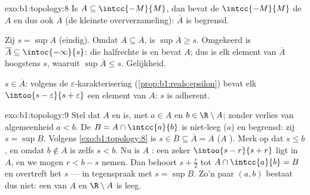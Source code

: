 \begin{solution}{exo:b1:topology:8}
Is $A \subseteq \intcc{-M}{M}$, dan bevat de 
$\intcc{-M}{M}$ de  $A$ en dus ook $\overline A$ (de kleinste
 oververzameling): $\overline A$ is begrensd.

Zij $s = \sup A$ (eindig). Omdat $A \subseteq \overline A$, is $\sup
\overline A \geq s$. Omgekeerd is $\overline A \subseteq
\intoc{-\infty}{s}$: die halfrechte is  en bevat $A$; dus is elk
element van $\overline A$ hoogstens $s$, waaruit $\sup\overline A \leq
s$. Gelijkheid.

$s \in \overline A$: volgens de $\varepsilon$-karakterisering
(\cref{prop:b1:reals:epsilon}) bevat elk  $\intoo{s -
\varepsilon}{s + \varepsilon}$ een element van $A$: $s$ is adherent.
\end{solution}

\begin{solution}{exo:b1:topology:9}
Stel dat $A$  en  is, met $a \in A$ en $b \in \R \setminus
A$; zonder verlies van algemeenheid $a < b$. De  $B = A \cap
\intcc{a}{b}$ is niet-leeg ($a$) en begrensd: zij $s = \sup B$. Volgens
\cref{exo:b1:topology:8} is $s \in \overline B \subseteq \overline A = A$
($A$ ). Merk op dat $s \leq b$, en omdat $b \notin A$ is zelfs $s
< b$. Nu is $A$ : een zeker  $\intoo{s - r}{s + r}$ ligt in
$A$, en we mogen $r < b - s$ nemen. Dan behoort $s + \frac{r}{2}$ tot $A
\cap \intcc{a}{b} = B$ en overtreft het $s$ --- in tegenspraak met $s =
\sup B$. Zo'n paar $(a, b)$ bestaat dus niet: een van $A$ en $\R
\setminus A$ is leeg.
\end{solution}

